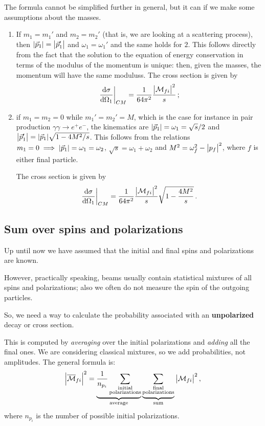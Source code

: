 \documentclass[main.tex]{subfiles}
\begin{document}
The formula cannot be simplified further in general, but it can if we make some assumptions about the masses. 
\begin{enumerate}
    \item If \(m_1 = m_1'\) and \(m_2 = m_2 '\) (that is, we are looking at a scattering process), then \(\abs{\vec{p}_1 }= \abs{\vec{p}'_1}\) and \(\omega_1 = \omega_1 '\) and the same holds for \(2\). This follows directly from the fact that the solution to the equation of energy conservation in terms of the modulus of the momentum is unique: then, given the masses, the momentum will have the same moduluss. The cross section is given by 
    \begin{align}
    \eval{\dv{\sigma }{\Omega_1 }}_{CM} = \frac{1}{64 \pi^2} \frac{\abs{\mathcal{M}_{fi}}^2}{s}
    \,;
    \end{align}
    \item  if \(m_1 = m_2 =0 \) while \(m_1 ' = m_2 ' = M\), which is the case for instance in pair production \(\gamma \gamma \to e^{+} e^{-} \), the kinematics are \(\abs{\vec{p}_1} = \omega_1 = \sqrt{s} / 2\) and \(\abs{\vec{p}_1'} = \abs{\vec{p}_1} \sqrt{1 - 4M^2/s}\).
    This follows from the relations \(m_1 =0 \implies \abs{\vec{p}_1} = \omega_{1} = \omega_2 \), \(\sqrt{s} = \omega_1 + \omega_2 \) and \(M^2 = \omega_{f}^2 - \abs{p_f}^2\), where \(f\) is either final particle.
    
    The cross section is given by 
    \begin{align} \label{eq:zero-initial-mass-cross-section}
    \eval{\dv{\sigma }{\Omega_1 }}_{CM} = \frac{1}{64 \pi^2} \frac{\abs{\mathcal{M}_{fi}}^2}{s}
    \sqrt{1 - \frac{4 M^2}{s}}
    \,.
    \end{align}
\end{enumerate}

\subsection{Sum over spins and polarizations}

Up until now we have assumed that the initial and final spins and polarizations are known. 

However, practically speaking, beams usually contain statistical mixtures of all spins and polarizations; also we often do not measure the spin of the outgoing particles. 

So, we need a way to calculate the probability associated with an \textbf{unpolarized} decay or cross section. 

This is computed by \emph{averaging} over the initial polarizations and \emph{adding} all the final ones. 
We are considering classical mixtures, so we add probabilities, not amplitudes. The general formula is:
%
\begin{align}
\abs{\overline{\mathcal{M}}_{fi}}^2
= \underbrace{\frac{1}{n_{p_i}} \sum _{\substack{\text{initial} \\ \text{polarizations}}}}_{\text{average}} \underbrace{\sum _{\substack{\text{final} \\ \text{polarizations}}}}_{\text{sum}} \abs{\mathcal{M}_{fi}}^2
\,,
\end{align}
%
where \(n_{p_i}\) is the number of possible initial polarizations.
\end{document}

